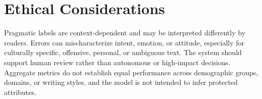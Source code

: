 \section{Ethical Considerations}

Pragmatic labels are context-dependent and may be interpreted differently by readers. Errors can mischaracterize intent, emotion, or attitude, especially for culturally specific, offensive, personal, or ambiguous text. The system should support human review rather than autonomous or high-impact decisions. Aggregate metrics do not establish equal performance across demographic groups, domains, or writing styles, and the model is not intended to infer protected attributes.
